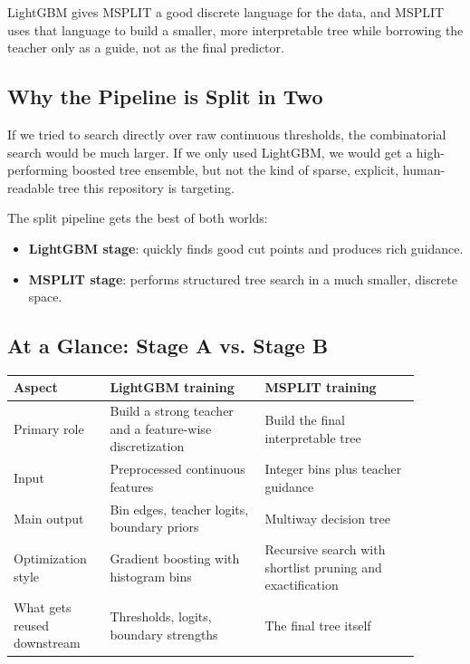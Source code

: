 \documentclass[11pt]{article}
\begin{document}
LightGBM gives MSPLIT a good discrete language for the data, and MSPLIT uses that language to build a smaller, more interpretable tree while borrowing the teacher only as a guide, not as the final predictor.

\subsection{Why the Pipeline is Split in Two}

If we tried to search directly over raw continuous thresholds, the combinatorial search would be much larger. If we only used LightGBM, we would get a high-performing boosted tree ensemble, but not the kind of sparse, explicit, human-readable tree this repository is targeting.

The split pipeline gets the best of both worlds:

\begin{itemize}
\item \textbf{LightGBM stage}: quickly finds good cut points and produces rich guidance.
\item \textbf{MSPLIT stage}: performs structured tree search in a much smaller, discrete space.
\end{itemize}

\subsection{At a Glance: Stage A vs. Stage B}

\begin{center}
\begin{tabular}{|p{0.21\linewidth}|p{0.34\linewidth}|p{0.34\linewidth}|}
\hline
\textbf{Aspect} & \textbf{LightGBM training} & \textbf{MSPLIT training} \\
\hline
Primary role & Build a strong teacher and a feature-wise discretization & Build the final interpretable tree \\
\hline
Input & Preprocessed continuous features & Integer bins plus teacher guidance \\
\hline
Main output & Bin edges, teacher logits, boundary priors & Multiway decision tree \\
\hline
Optimization style & Gradient boosting with histogram bins & Recursive search with shortlist pruning and exactification \\
\hline
What gets reused downstream & Thresholds, logits, boundary strengths & The final tree itself \\
\hline
\end{tabular}
\end{center}
\end{document}
